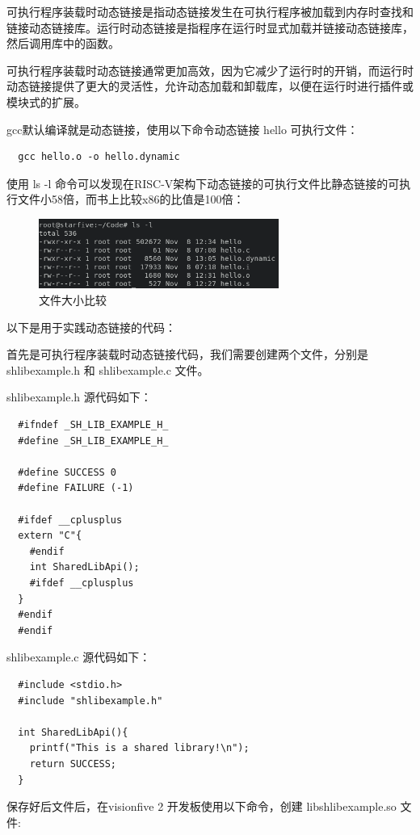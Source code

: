 \documentclass[lang=cn,10pt]{elegantbook}
\begin{document}
可执行程序装载时动态链接是指动态链接发生在可执行程序被加载到内存时查找和链接动态链接库。运行时动态链接是指程序在运行时显式加载并链接动态链接库，然后调用库中的函数。

可执行程序装载时动态链接通常更加高效，因为它减少了运行时的开销，而运行时动态链接提供了更大的灵活性，允许动态加载和卸载库，以便在运行时进行插件或模块式的扩展。

gcc默认编译就是动态链接，使用以下命令动态链接 hello 可执行文件：

\begin{lstlisting}
  gcc hello.o -o hello.dynamic
\end{lstlisting}

使用  ls -l 命令可以发现在RISC-V架构下动态链接的可执行文件比静态链接的可执行文件小58倍，而书上比较x86的比值是100倍：
\begin{figure}[htbp]
  \centering
  \includegraphics[width=0.7\textwidth]{image/image-20231108210901120.png}
  \caption{文件大小比较}
\end{figure}

以下是用于实践动态链接的代码：

首先是可执行程序装载时动态链接代码，我们需要创建两个文件，分别是 shlibexample.h 和 shlibexample.c 文件。

shlibexample.h 源代码如下：


\begin{lstlisting}
  #ifndef _SH_LIB_EXAMPLE_H_
  #define _SH_LIB_EXAMPLE_H_

  #define SUCCESS 0
  #define FAILURE (-1)

  #ifdef __cplusplus
  extern "C"{
    #endif
    int SharedLibApi();
    #ifdef __cplusplus
  }
  #endif
  #endif
\end{lstlisting}

shlibexample.c  源代码如下：

\begin{lstlisting}
  #include <stdio.h>
  #include "shlibexample.h"

  int SharedLibApi(){
    printf("This is a shared library!\n");
    return SUCCESS;
  }
\end{lstlisting}
保存好后文件后，在visionfive 2 开发板使用以下命令，创建 libshlibexample.so 文件:
\end{document}
